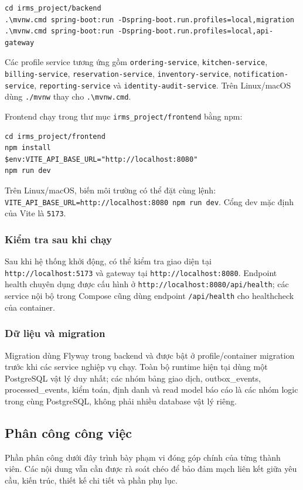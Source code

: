 \begin{verbatim}
cd irms_project/backend
.\mvnw.cmd spring-boot:run -Dspring-boot.run.profiles=local,migration
.\mvnw.cmd spring-boot:run -Dspring-boot.run.profiles=local,api-gateway
\end{verbatim}

Các profile service tương ứng gồm \texttt{ordering-service}, \texttt{kitchen-service}, \texttt{billing-service}, \texttt{reservation-service}, \texttt{inventory-service}, \texttt{notification-service}, \texttt{reporting-service} và \texttt{identity-audit-service}. Trên Linux/macOS dùng \texttt{./mvnw} thay cho \texttt{.\textbackslash mvnw.cmd}.

Frontend chạy trong thư mục \texttt{irms\_project/frontend} bằng npm:

\begin{verbatim}
cd irms_project/frontend
npm install
$env:VITE_API_BASE_URL="http://localhost:8080"
npm run dev
\end{verbatim}

Trên Linux/macOS, biến môi trường có thể đặt cùng lệnh: \texttt{VITE\_API\_BASE\_URL=http://localhost:8080 npm run dev}. Cổng dev mặc định của Vite là \texttt{5173}.

\subsubsection*{Kiểm tra sau khi chạy}

Sau khi hệ thống khởi động, có thể kiểm tra giao diện tại \texttt{http://localhost:5173} và gateway tại \texttt{http://localhost:8080}. Endpoint health chuyên dụng được cấu hình ở \texttt{http://localhost:8080/api/health}; các service nội bộ trong Compose cũng dùng endpoint \texttt{/api/health} cho healthcheck của container.

\subsubsection*{Dữ liệu và migration}

Migration dùng Flyway trong backend và được bật ở profile/container migration trước khi các service nghiệp vụ chạy. Toàn bộ runtime hiện tại dùng một \textsf{PostgreSQL} vật lý duy nhất; các nhóm bảng giao dịch, \textsf{outbox\_events}, \textsf{processed\_events}, kiểm toán, định danh và read model báo cáo là các nhóm logic trong cùng PostgreSQL, không phải nhiều database vật lý riêng.
\subsection{Phân công công việc}
Phần phân công dưới đây trình bày phạm vi đóng góp chính của từng thành viên. Các nội dung vẫn cần được rà soát chéo để bảo đảm mạch liên kết giữa yêu cầu, kiến trúc, thiết kế chi tiết và phần phụ lục.

